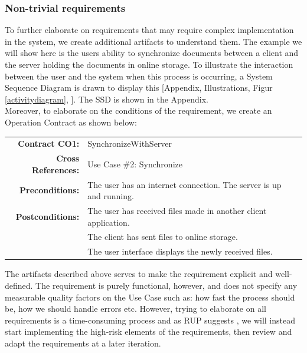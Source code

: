 \subsubsection{Non-trivial requirements}
To further elaborate on requirements that may require complex implementation in the system, we create additional artifacts to understand them. The example we will show here is the users ability to synchronize documents between a client and the server holding the documents in online storage. To illustrate the interaction between the user and the system when this process is occurring, a System Sequence Diagram is drawn to display this [Appendix, Illustrations, Figur \ref{activitydiagram}, \pageref{systemsequencediagram}]. The SSD is shown in the Appendix.\\
Moreover, to elaborate on the conditions of the requirement, we create an Operation Contract as shown below:\\
\begin{table}[ht]\centering
  \begin{tabularx}{\textwidth}{@{}rXXl@{}}\toprule
    \textbf{Contract CO1:} & SynchronizeWithServer\\
    \textbf{Cross References:} & Use Case \#2: Synchronize\\
    \textbf{Preconditions:} &  The user has an internet connection. The server is up and running.\\
    \textbf{Postconditions:} & The user has received files made in another client application.\\
    & The client has sent files to online storage.\\
    & The user interface displays the newly received files.\\
    \bottomrule
  \end{tabularx}
\end{table}
The artifacts described above serves to make the requirement explicit and well-defined. The requirement is purely functional, however, and does not specify any measurable quality factors on the Use Case such as: how fast the process should be, how we should handle errors etc. However, trying to elaborate on all requirements is a time-consuming process and as RUP suggests \cite[12.2 p.~196]{OOAD}, we will instead start implementing the high-risk elements of the requirements, then review and adapt the requirements at a later iteration. \\
